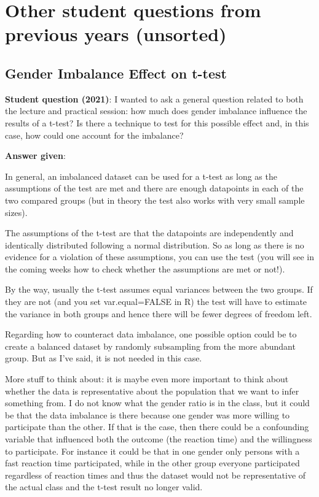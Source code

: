 \documentclass[
  letterpaper,
  8pt,
  a4paper]{book}
\begin{document}
\section*{Other student questions from previous years
(unsorted)}\label{other-student-questions-from-previous-years-unsorted}


\subsection*{Gender Imbalance Effect on
t-test}\label{gender-imbalance-effect-on-t-test}

\textbf{Student question (2021)}: I wanted to ask a general question
related to both the lecture and practical session: how much does gender
imbalance influence the results of a t-test? Is there a technique to
test for this possible effect and, in this case, how could one account
for the imbalance?

\textbf{Answer given}:

In general, an imbalanced dataset can be used for a t-test as long as
the assumptions of the test are met and there are enough datapoints in
each of the two compared groups (but in theory the test also works with
very small sample sizes).

The assumptions of the t-test are that the datapoints are independently
and identically distributed following a normal distribution. So as long
as there is no evidence for a violation of these assumptions, you can
use the test (you will see in the coming weeks how to check whether the
assumptions are met or not!).

By the way, usually the t-test assumes equal variances between the two
groups. If they are not (and you set var.equal=FALSE in R) the test will
have to estimate the variance in both groups and hence there will be
fewer degrees of freedom left.

Regarding how to counteract data imbalance, one possible option could be
to create a balanced dataset by randomly subsampling from the more
abundant group. But as I've said, it is not needed in this case.

More stuff to think about: it is maybe even more important to think
about whether the data is representative about the population that we
want to infer something from. I do not know what the gender ratio is in
the class, but it could be that the data imbalance is there because one
gender was more willing to participate than the other. If that is the
case, then there could be a confounding variable that influenced both
the outcome (the reaction time) and the willingness to participate. For
instance it could be that in one gender only persons with a fast
reaction time participated, while in the other group everyone
participated regardless of reaction times and thus the dataset would not
be representative of the actual class and the t-test result no longer
valid.
\end{document}
